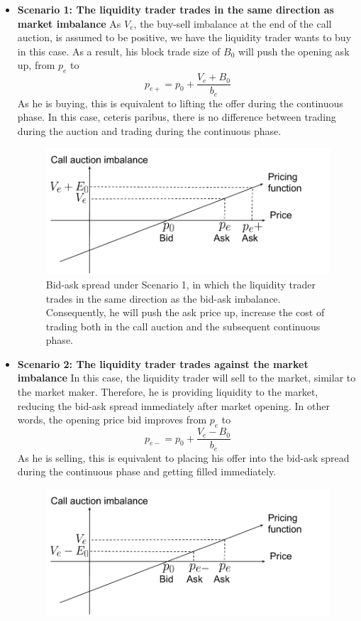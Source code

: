 \documentclass{article}
\begin{document}
\begin{itemize}
  \item {\textbf{Scenario 1: The liquidity trader trades in the same direction as market imbalance}
        As $V_e$, the buy-sell imbalance at the end of the call auction, is assumed to be positive, we have the liquidity trader wants to buy in this case. As a result, his block trade size of $B_0$ will push the opening ask up, from $p_e$ to
        \[
          p_{e+} =  p_0 + \frac{V_e + B_0}{b_e}
        \]
        As he is buying, this is equivalent to lifting the offer during the continuous phase. In this case, ceteris paribus, there is no difference between trading during the auction and trading during the continuous phase.

        \begin{figure}[h]
          \includegraphics[width=\textwidth]{MMPricingTransitionSameDir}
          \caption{Bid-ask spread under Scenario 1, in which the liquidity trader trades in the same direction as the bid-ask imbalance. Consequently, he will push the ask price up, increase the cost of trading both in the call auction and the subsequent continuous phase.}
          \label{fig:mm_pricing_transition_s1}
        \end{figure}
        }
  \item {
        \textbf{Scenario 2: The liquidity trader trades against the market imbalance}
        In this case, the liquidity trader will sell to the market, similar to the market maker. Therefore, he is providing liquidity to the market, reducing the bid-ask spread immediately after market opening. In other words, the opening price bid improves from $p_e$ to
        \[
          p_{e-} = p_0 + \frac{V_e - B_0}{b_e}
        \]
        As he is selling, this is equivalent to placing his offer into the bid-ask spread during the continuous phase and getting filled immediately.
        \begin{figure}[h]
          \includegraphics[width=\textwidth]{MMPricingTransitionDifferentDir}

\end{figure}}
\end{itemize}
\end{document}
